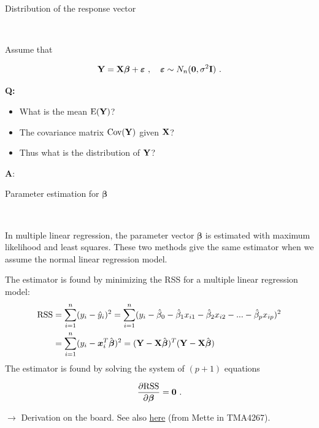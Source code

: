 \documentclass[10pt,ignorenonframetext,]{beamer}
\begin{document}
\begin{frame}

\begin{block}{Distribution of the response vector}

\(~\)

Assume that

\[{\bf Y=X \boldsymbol\beta}+{\boldsymbol \varepsilon} \ , \quad \boldsymbol\varepsilon\sim N_n({\bf 0},\sigma^2 {\bf I}) \ . \]

\vspace{4mm}

\textbf{Q:}

\begin{itemize}
\item
  What is the mean \(\text{E}(\bf Y)\)?
\item
  The covariance matrix \(\text{Cov}(\bf Y)\) given \(\bf{X}\)?
\item
  Thus what is the distribution of \(\bf Y\)?
\end{itemize}

\end{block}

\end{frame}

\begin{frame}

\textbf{A}:

\end{frame}

\begin{frame}

\begin{block}{Parameter estimation for \(\boldsymbol{\beta}\)}

\(~\)

In multiple linear regression, the parameter vector \(\boldsymbol\beta\)
is estimated with maximum likelihood and least squares. These two
methods give the same estimator when we assume the normal linear
regression model.

The estimator is found by minimizing the RSS for a multiple linear
regression model:
\[\begin{aligned} \text{RSS} &=\sum_{i=1}^n (y_i - \hat y_i)^2 = \sum_{i=1}^n (y_i - \hat \beta_0 - \hat \beta_1 x_{i1} - \hat \beta_2 x_{i2} -...-\hat \beta_p x_{ip} )^2 \\
&= \sum_{i=1}^n (y_i-{\boldsymbol x}_i^T \hat{\boldsymbol\beta})^2=({\bf Y}-{\bf X}\hat{\boldsymbol{\beta}})^T({\bf Y}-{\bf X}\hat{\boldsymbol{\beta}})\end{aligned}\]
The estimator is found by solving the system of \((p+1)\) equations

\[\frac{\partial \text{RSS}}{\partial \boldsymbol \beta}={\bf 0} \ .\]

\(\rightarrow\) Derivation on the board. See also
\href{https://www.math.ntnu.no/emner/TMA4268/2018v/notes/LeastSquaresMLR.pdf}{here}
(from Mette in TMA4267).

\end{block}

\end{frame}
\end{document}
